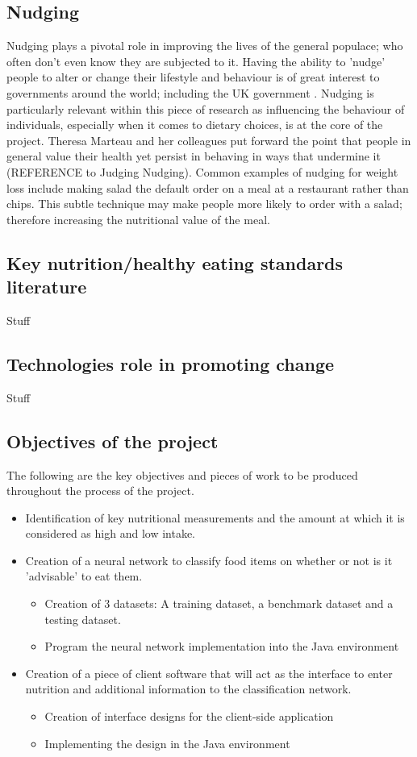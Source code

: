 \documentclass[11pt]{article}
\begin{document}
	\subsection{Nudging}
	Nudging plays a pivotal role in improving the lives of the general populace; who often don't even know they are subjected to it. Having the ability to 'nudge' people to 	alter or change their lifestyle and behaviour is of great interest to governments 			around the world; including the UK government \citep{regulating2011judging}. Nudging is particularly relevant within this piece of research as influencing the 			behaviour of individuals, especially when it comes to dietary choices, is at the core 		of the project. Theresa Marteau and her colleagues put forward the point that people in general value their health yet persist in behaving in ways that undermine it (REFERENCE to Judging Nudging). Common examples of nudging for weight loss include making salad the default order on a meal at a restaurant rather than chips. This subtle technique may make people more likely to order with a salad; therefore increasing the nutritional value of the meal.
	\subsection{Key nutrition/healthy eating standards literature}
	Stuff
	\subsection{Technologies role in promoting change}
	Stuff
	\subsection{Objectives of the project}
	The following are the key objectives and pieces of work to be produced throughout the process of the project.
	\begin{itemize}
		\item Identification of key nutritional measurements and the amount at which it is considered as high and low intake.
		\item Creation of a neural network to classify food items on whether or not is it 'advisable' to eat them.
		\begin{itemize}
			\item Creation of 3 datasets: A training dataset, a benchmark dataset and a testing dataset.
			\item Program the neural network implementation into the Java environment 
		\end{itemize}
		\item Creation of a piece of client software that will act as the interface to enter nutrition and additional information to the classification network.
		\begin{itemize}
			\item Creation of interface designs for the client-side application
			\item Implementing the design in the Java environment
		\end{itemize}
	\end{itemize}
\pagebreak
\end{document}
